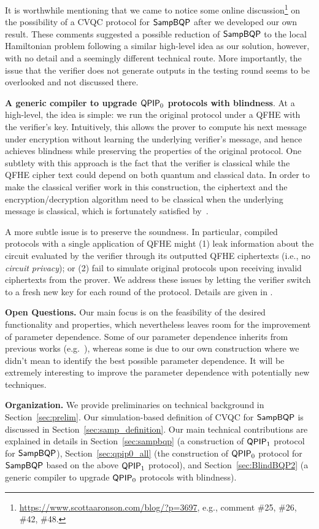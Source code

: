 It is worthwhile mentioning that we came to notice some online discussion\footnote{\url{https://www.scottaaronson.com/blog/?p=3697}, e.g., comment \#25, \#26, \#42, \#48. } on the possibility of a CVQC protocol for $\operatorname{\mathsf{SampBQP}}$ after we developed our own result. 
These comments suggested a possible reduction of $\operatorname{\mathsf{SampBQP}}$ to the local Hamiltonian problem following a similar high-level idea as our solution, however, with no detail and a seemingly different technical route. More importantly, the issue that the verifier does not generate outputs in the testing round seems to be overlooked and not discussed there.

\vspace{2mm} \noindent \textbf{A generic compiler to upgrade $\operatorname{\mathsf{QPIP}}_0$ protocols with blindness}. At a high-level, the idea is simple: we run the original protocol under a QFHE with the verifier's key. Intuitively, this allows the prover to compute his next message under encryption without learning the underlying verifier's message, and hence achieves blindness while preserving the properties of the original protocol.
One subtlety with this approach is the fact that the verifier is classical while the QFHE cipher text could depend on both quantum and classical data.
In order to make the classical verifier work in this construction, the ciphertext and the encryption/decryption algorithm need to be classical when the underlying message is classical, which is fortunately satisfied by~\cite{mahadev_qfhe}.

A more subtle issue is to preserve the soundness.
In particular, compiled protocols with a single application of QFHE might (1) leak information about the circuit evaluated by the verifier through its outputted QFHE ciphertexts (i.e., no \emph{circuit privacy});
or (2) fail to simulate original protocols upon receiving invalid ciphertexts from the prover.
We address these issues by letting the verifier switch to a fresh new key for each round of the protocol. 
Details are given in .

\vspace{2mm} \noindent \textbf{Open Questions.} Our main focus is on the feasibility of the desired functionality and properties, which nevertheless leaves room for the improvement of parameter dependence.
Some of our parameter dependence inherits from previous works (e.g.~\cite{FOCS:Mahadev18a}), whereas some is due to our own construction where we didn't mean to identify the best possible parameter dependence. 
It will be extremely interesting to improve the parameter dependence with potentially new techniques. 

\vspace{2mm} \noindent \textbf{Organization.} We provide preliminaries on technical background in Section~\ref{sec:prelim}. 
Our simulation-based definition of CVQC for $\operatorname{\mathsf{SampBQP}}$ is discussed in Section~\ref{sec:samp_definition}. 
Our main technical contributions are explained in details in Section~\ref{sec:sampbqp} (a construction of $\operatorname{\mathsf{QPIP}}_1$ protocol for $\operatorname{\mathsf{SampBQP}}$), 
Section~\ref{sec:qpip0_all} (the construction of $\operatorname{\mathsf{QPIP}}_0$ protocol for $\operatorname{\mathsf{SampBQP}}$ based on the above $\operatorname{\mathsf{QPIP}}_1$ protocol), 
and Section~\ref{sec:BlindBQP2} (a generic compiler to upgrade $\operatorname{\mathsf{QPIP}}_0$ protocols with blindness). 